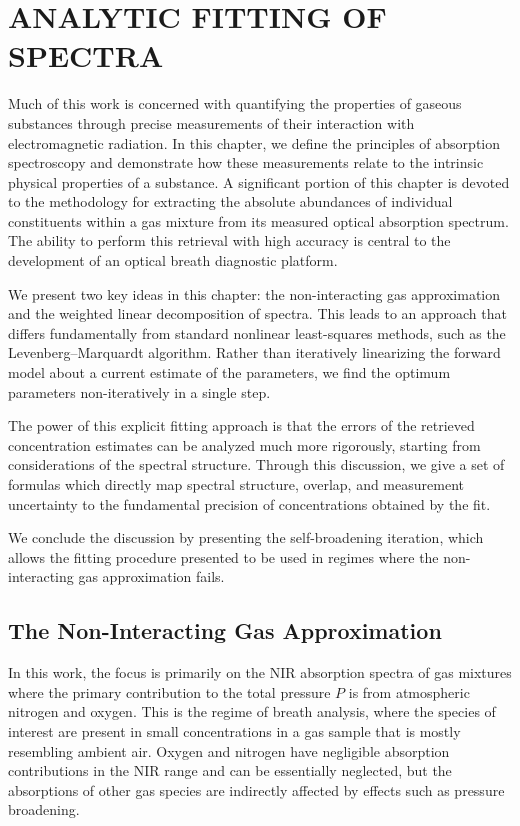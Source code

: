 \documentclass[12pt]{report}
\begin{document}
	
	\chapter{ANALYTIC FITTING OF SPECTRA} \label{chap:fitting_spectra}
	Much of this work is concerned with quantifying the properties of gaseous substances through precise measurements of their interaction with electromagnetic radiation. In this chapter, we define the principles of absorption spectroscopy and demonstrate how these measurements relate to the intrinsic physical properties of a substance. A significant portion of this chapter is devoted to the methodology for extracting the absolute abundances of individual constituents within a gas mixture from its measured optical absorption spectrum. The ability to perform this retrieval with high accuracy is central to the development of an optical breath diagnostic platform.
	
	We present two key ideas in this chapter: the non-interacting gas approximation and the weighted linear decomposition of spectra. This leads to an approach that differs fundamentally from standard nonlinear least-squares methods, such as the Levenberg–Marquardt algorithm. Rather than iteratively linearizing the forward model about a current estimate of the parameters, we find the optimum parameters non-iteratively in a single step.
	
	The power of this explicit fitting approach is that the errors of the retrieved concentration estimates can be analyzed much more rigorously, starting from considerations of the spectral structure. Through this discussion, we give a set of formulas which directly map spectral structure, overlap, and measurement uncertainty to the fundamental precision of concentrations obtained by the fit.
	
	We conclude the discussion by presenting the self-broadening iteration, which allows the fitting procedure presented to be used in regimes where the non-interacting gas approximation fails.
	
	
	\section{The Non-Interacting Gas Approximation} \label{sec:non_interacting_gas}
	In this work, the focus is primarily on the NIR absorption spectra of gas mixtures where the primary contribution to the total pressure $P$ is from atmospheric nitrogen and oxygen. This is the regime of breath analysis, where the species of interest are present in small concentrations in a gas sample that is mostly resembling ambient air. Oxygen and nitrogen have negligible absorption contributions in the NIR range and can be essentially neglected, but the absorptions of other gas species are indirectly affected by effects such as pressure broadening.
	
\end{document}
